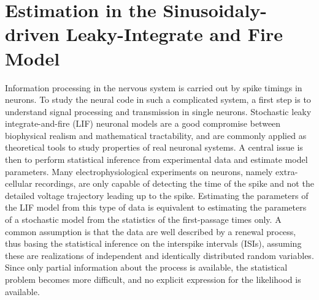 \chapter{Estimation in the Sinusoidaly-driven Leaky-Integrate and Fire Model}
\label{ch:estimate}
\graphicspath{{../LIFEPaper/}}

 
Information processing in the nervous system is carried out by spike timings in
neurons. To study the neural code in such a complicated system, a first step is
to understand signal processing and transmission in single neurons. Stochastic
leaky integrate-and-fire (LIF) neuronal models are a good compromise between
biophysical realism and mathematical tractability, and are commonly applied as
theoretical tools to study properties of real neuronal systems. A central issue
is then to perform statistical inference from experimental data and estimate
model parameters. Many electrophysiological experiments on neurons, namely
extra-cellular recordings, are only capable of detecting the time of the spike
and not the detailed voltage trajectory leading up to the spike. Estimating the
parameters of the LIF model from this type of data is equivalent to estimating
the parameters of a stochastic model from the statistics of the first-passage
times only. A common assumption is that the data are well described by a renewal
process, thus basing the statistical inference on the interspike intervals
(ISIs), assuming these are realizations of independent and identically
distributed random variables. Since only partial information about the process
is available, the statistical problem becomes more difficult, and no explicit
expression for the likelihood is available. 

